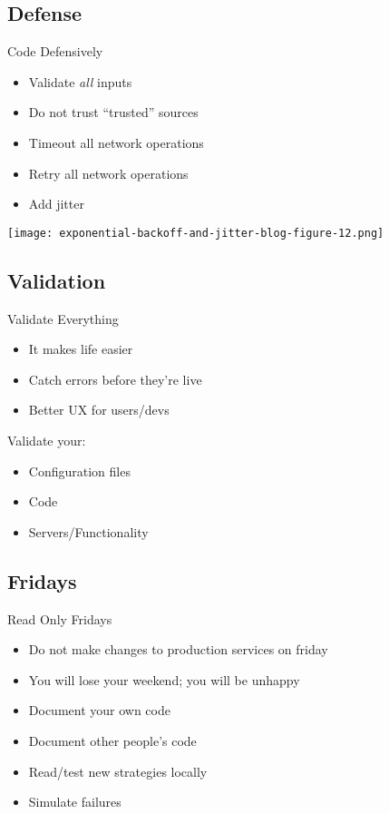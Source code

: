 \documentclass[12pt]{ufrslides}
\begin{document}
\subsection{Defense}
\begin{frame}{Code Defensively}
	\begin{itemize}
		\item Validate \emph{all} inputs
		\item Do not trust ``trusted'' sources
		\item Timeout all network operations
		\item Retry all network operations
		\item Add jitter\cite{aws:jitter}
	\end{itemize}
	\texttt{[image: exponential-backoff-and-jitter-blog-figure-12.png]}
\end{frame}

\subsection{Validation}
\begin{frame}{Validate Everything}
	\begin{itemize}
		\item It makes life easier
		\item Catch errors before they're live
		\item Better UX for users/devs
	\end{itemize}
	Validate your:
	\begin{itemize}
		\item Configuration files
		\item Code
		\item Servers/Functionality
	\end{itemize}
\end{frame}

\subsection{Fridays}
\begin{frame}{Read Only Fridays}
	\begin{itemize}
		\item Do not make changes to production services on friday
		\item You will lose your weekend; you will be unhappy
		\item Document your own code
		\item Document other people's code
		\item Read/test new strategies locally
		\item Simulate failures
	\end{itemize}
\end{frame}
\end{document}
